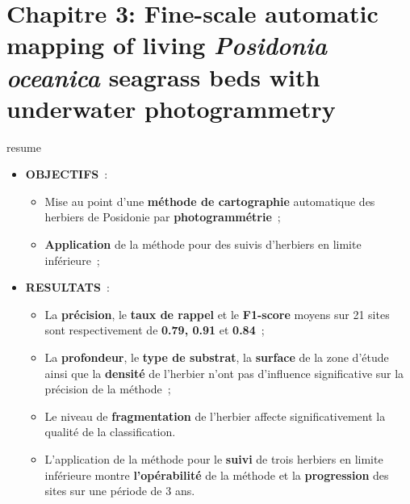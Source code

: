 \chapter[Fine-scale automatic mapping of living \textit{Posidonia oceanica} seagrass beds with underwater photogrammetry]{Chapitre 3: Fine-scale automatic mapping of living \textit{Posidonia oceanica} seagrass beds with underwater photogrammetry} \label{chapitre3-herbiers}

\pagestyle{main}


\begin{center}
\begin{colbox}{resume}
  \vspace{-2pt}
{\color{textresume}\small
\begin{itemize}[leftmargin=0in]\itemsep3pt
\item \textbf{OBJECTIFS}~:
    \begin{itemize}
      \item Mise au point d'une \textbf{méthode de cartographie} automatique des herbiers de Posidonie par \textbf{photogrammétrie}~;
      \item \textbf{Application} de la méthode pour des suivis d'herbiers en limite inférieure~;
    \end{itemize}
\item \textbf{RESULTATS}~:
    \begin{itemize}
      \item La \textbf{précision}, le \textbf{taux de rappel} et le \textbf{F1-score} moyens sur 21 sites sont respectivement de \textbf{0.79, 0.91} et \textbf{0.84}~;
      \item La \textbf{profondeur}, le \textbf{type de substrat}, la \textbf{surface} de la zone d'étude ainsi que la \textbf{densité} de l'herbier n'ont pas d'influence significative sur la précision de la méthode~;
      \item Le niveau de \textbf{fragmentation} de l'herbier affecte significativement la qualité de la classification.
      \item L'application de la méthode pour le \textbf{suivi} de trois herbiers en limite inférieure montre \textbf{l'opérabilité} de la méthode et la \textbf{progression} des sites sur une période de 3 ans.
    \end{itemize}
\end{itemize}
}
\vspace{-2pt}
\end{colbox}
\end{center}


